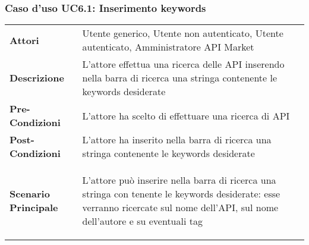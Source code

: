 \subsubsection{Caso d'uso UC6.1: Inserimento keywords}
\label{UC6_1}

\begin{minipage}{\linewidth}
\begin{tabular}{ l | p{11cm}}
	\hline
	\rowcolor{Gray}
	 \multicolumn{2}{c}{UC6.1 - Inserimento keywords} \\
	 \hline
	\textbf{Attori} & Utente generico, Utente non autenticato, Utente autenticato, Amministratore API Market \\
	\textbf{Descrizione} & L'attore effettua una ricerca delle API inserendo nella barra di ricerca una stringa contenente le keywords desiderate \\
	\textbf{Pre-Condizioni} & L'attore ha scelto di effettuare una ricerca di API \\
	\textbf{Post-Condizioni} & L'attore ha inserito nella barra di ricerca una stringa contenente le keywords desiderate \\
	\textbf{Scenario Principale} & 
	\begin{enumerate*}[label=(\arabic*.),itemjoin={\newline}]
		\item L'attore può inserire nella barra di ricerca una stringa con tenente le keywords desiderate: esse verranno ricercate sul nome dell'API, sul nome dell'autore e su eventuali tag
	\end{enumerate*}\\
\end{tabular}
\end{minipage}